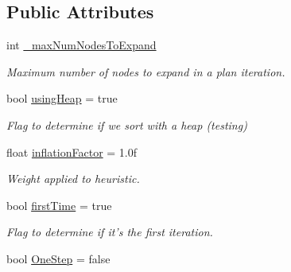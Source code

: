 \subsection*{Public Attributes}
\begin{DoxyCompactItemize}
\item 
\hypertarget{class_a_r_astar_planner_a093fb1dbafd57ec94a5103ddc1679fc4}{int \hyperlink{class_a_r_astar_planner_a093fb1dbafd57ec94a5103ddc1679fc4}{\-\_\-max\-Num\-Nodes\-To\-Expand}}\label{class_a_r_astar_planner_a093fb1dbafd57ec94a5103ddc1679fc4}

\begin{DoxyCompactList}\small\item\em Maximum number of nodes to expand in a plan iteration. \end{DoxyCompactList}\item 
\hypertarget{class_a_r_astar_planner_ab31142d8f16ef4866ff6932098642fb5}{bool \hyperlink{class_a_r_astar_planner_ab31142d8f16ef4866ff6932098642fb5}{using\-Heap} = true}\label{class_a_r_astar_planner_ab31142d8f16ef4866ff6932098642fb5}

\begin{DoxyCompactList}\small\item\em Flag to determine if we sort with a heap (testing) \end{DoxyCompactList}\item 
\hypertarget{class_a_r_astar_planner_aa8318cf3bb76371812d9fffc4f4d0e9a}{float \hyperlink{class_a_r_astar_planner_aa8318cf3bb76371812d9fffc4f4d0e9a}{inflation\-Factor} = 1.\-0f}\label{class_a_r_astar_planner_aa8318cf3bb76371812d9fffc4f4d0e9a}

\begin{DoxyCompactList}\small\item\em Weight applied to heuristic. \end{DoxyCompactList}\item 
\hypertarget{class_a_r_astar_planner_a6df1ebaf2825a698b4cdec8e31da53bd}{bool \hyperlink{class_a_r_astar_planner_a6df1ebaf2825a698b4cdec8e31da53bd}{first\-Time} = true}\label{class_a_r_astar_planner_a6df1ebaf2825a698b4cdec8e31da53bd}

\begin{DoxyCompactList}\small\item\em Flag to determine if it's the first iteration. \end{DoxyCompactList}\item 
\hypertarget{class_a_r_astar_planner_aaffc01fe24f512518ba8ec49a6900f8a}{bool \hyperlink{class_a_r_astar_planner_aaffc01fe24f512518ba8ec49a6900f8a}{One\-Step} = false}\label{class_a_r_astar_planner_aaffc01fe24f512518ba8ec49a6900f8a}


\end{DoxyCompactItemize}
